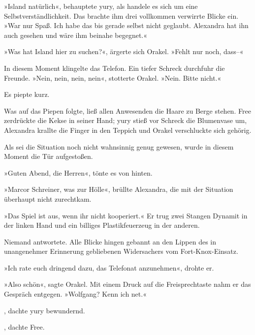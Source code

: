 »Island natürlich«, behauptete yury, als handele es sich um eine Selbstverständlichkeit. Das brachte ihm drei vollkommen verwirrte Blicke ein. »War nur Spaß. Ich habe das bis gerade selbst nicht geglaubt. Alexandra hat ihn auch gesehen und wäre ihm beinahe begegnet.«

»Was hat Island hier zu suchen?«, ärgerte sich Orakel. »Fehlt nur noch, dass–«

In diesem Moment klingelte das Telefon. Ein tiefer Schreck durchfuhr die Freunde. »Nein, nein, nein, nein«, stotterte Orakel. »Nein. Bitte nicht.«

 Es piepte kurz.

Was auf das Piepen folgte, ließ allen Anwesenden die Haare zu Berge stehen. Free zerdrückte die Kekse in seiner Hand; yury stieß vor Schreck die Blumenvase um, Alexandra krallte die Finger in den Teppich und Orakel verschluckte sich gehörig.


Als sei die Situation noch nicht wahnsinnig genug gewesen, wurde in diesem Moment die Tür aufgestoßen.

»Guten Abend, die Herren«, tönte es von hinten.

»Marcor Schreiner, was zur Hölle«, brüllte Alexandra, die mit der Situation überhaupt nicht zurechtkam.

»Das Spiel ist aus, wenn ihr nicht kooperiert.« Er trug zwei Stangen Dynamit in der linken Hand und ein billiges Plastikfeuerzeug in der anderen.

Niemand antwortete. Alle Blicke hingen gebannt an den Lippen des in unangenehmer Erinnerung gebliebenen Widersachers vom Fort-Knox-Einsatz.

»Ich rate euch dringend dazu, das Telefonat anzunehmen«, drohte er.

»Also schön«, sagte Orakel. Mit einem Druck auf die Freisprechtaste nahm er das Gespräch entgegen. »Wolfgang? Kenn ich net.«

, dachte yury bewundernd.

, dachte Free.

